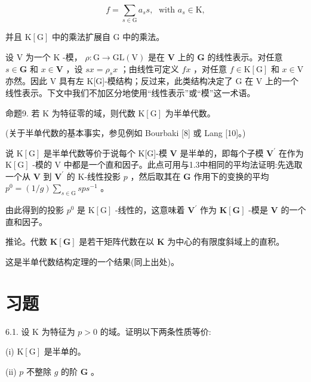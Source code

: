 \documentclass[10pt]{article}
\begin{document}
\[
f = \mathop{\sum }\limits_{{s \in  \mathrm{G}}}{a}_{s}s,\;\text{ with }{a}_{s} \in  \mathrm{K},
\]

并且 \(\mathrm{K}\left\lbrack  \mathrm{G}\right\rbrack\) 中的乘法扩展自 \(\mathrm{G}\) 中的乘法。

设 \(\mathrm{V}\) 为一个 \(\mathrm{K}\) -模， \(\rho  : \mathrm{G} \rightarrow  \mathrm{{GL}}\left( \mathrm{V}\right)\) 是在 \(\mathbf{V}\) 上的 \(\mathbf{G}\) 的线性表示。对任意 \(s \in  \mathbf{G}\) 和 \(x \in  \mathbf{V}\) ，设 \({sx} = {\rho }_{s}x\) ；由线性可定义 \({fx}\) ，对任意 \(f \in  \mathrm{K}\left\lbrack  \mathrm{G}\right\rbrack\) 和 \(x \in  \mathrm{V}\) 亦然。因此 \(\mathrm{V}\) 具有左 K[G]-模结构；反过来，此类结构决定了 G 在 V 上的一个线性表示。下文中我们不加区分地使用“线性表示”或“模”这一术语。

命题9. 若 \(\mathrm{K}\) 为特征零的域，则代数 \(\mathrm{K}\left\lbrack  \mathrm{G}\right\rbrack\) 为半单代数。

(关于半单代数的基本事实，参见例如 Bourbaki [8] 或 Lang [10]。)

说 \(\mathrm{K}\left\lbrack  \mathrm{G}\right\rbrack\) 是半单代数等价于说每个 K[G]-模 \(\mathbf{V}\) 是半单的，即每个子模 \({\mathbf{V}}^{\prime }\) 在作为 \(\mathrm{K}\left\lbrack  \mathrm{G}\right\rbrack\) -模的 \(\mathrm{V}\) 中都是一个直和因子。此点可用与1.3中相同的平均法证明:先选取一个从 \(\mathbf{V}\) 到 \({\mathbf{V}}^{\prime }\) 的 K-线性投影 \(p\) ，然后取其在 \(\mathbf{G}\) 作用下的变换的平均 \({p}^{0} = \left( {1/g}\right) \mathop{\sum }\limits_{{s \in  \mathrm{G}}}{sp}{s}^{-1}\) 。

由此得到的投影 \({p}^{0}\) 是 \(\mathrm{K}\left\lbrack  \mathrm{G}\right\rbrack\) -线性的，这意味着 \({\mathbf{V}}^{\prime }\) 作为 \(\mathbf{K}\left\lbrack  \mathbf{G}\right\rbrack\) -模是 \(\mathbf{V}\) 的一个直和因子。

推论。代数 \(\mathbf{K}\left\lbrack  \mathbf{G}\right\rbrack\) 是若干矩阵代数在以 \(\mathbf{K}\) 为中心的有限度斜域上的直积。

这是半单代数结构定理的一个结果(同上出处)。

\section*{习题}

6.1. 设 \(\mathrm{K}\) 为特征为 \(p > 0\) 的域。证明以下两条性质等价:

(i) \(\mathrm{K}\left\lbrack  \mathrm{G}\right\rbrack\) 是半单的。

(ii) \(p\) 不整除 \(g\) 的阶 \(\mathbf{G}\) 。
\end{document}
